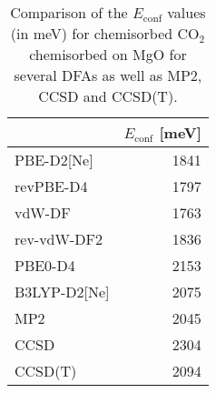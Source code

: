 \begin{table}
\caption{\label{tab:econf_co2}Comparison of the $E_\textrm{conf}$ values (in meV) for chemisorbed CO$_2$ chemisorbed on MgO for several DFAs as well as MP2, CCSD and CCSD(T).}
\begin{tabular}{lr}
\toprule
 & $E_\textrm{conf}$ [meV] \\ 
\midrule
PBE-D2[Ne] & 1841 \\
revPBE-D4 & 1797 \\
vdW-DF & 1763 \\
rev-vdW-DF2 & 1836 \\
PBE0-D4 & 2153 \\
B3LYP-D2[Ne] & 2075 \\
MP2 & 2045 \\
CCSD & 2304 \\
CCSD(T) & 2094 \\
\bottomrule
\end{tabular}
\end{table}
